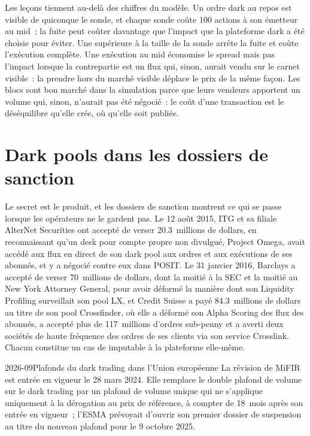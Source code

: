 Les leçons tiennent au-delà des chiffres du modèle. Un ordre dark au repos est visible de quiconque le sonde, et chaque sonde coûte 100 actions à son émetteur au
mid~; la fuite peut coûter davantage que l'impact que la plateforme dark a été choisie pour éviter. Une  supérieure à la taille de la sonde arrête la fuite et coûte
l'exécution complète. Une exécution au mid économise le spread mais pas l'impact lorsque la contrepartie est un flux qui, sinon, aurait vendu sur le carnet visible~: la prendre
hors du marché visible déplace le prix de la même façon. Les blocs sont bon marché dans la simulation parce que leurs vendeurs apportent un volume qui, sinon, n'aurait pas
été négocié~: le coût d'une transaction est le déséquilibre qu'elle crée, où qu'elle soit publiée.

\section{Dark pools dans les dossiers de sanction}

Le secret est le produit, et les dossiers de sanction montrent ce qui se passe lorsque les opérateurs ne le gardent pas. Le 12 août 2015, ITG et sa filiale AlterNet
Securities ont accepté de verser 20.3~millions de dollars, en reconnaissant qu'un desk pour compte propre non divulgué, Project Omega, avait accédé aux flux en direct de son dark pool
aux ordres et aux exécutions de ses abonnés, et y a négocié contre eux dans POSIT. Le 31 janvier 2016, Barclays a accepté de verser 70~millions de dollars, dont la moitié à la SEC et
la moitié au New York Attorney General, pour avoir déformé la manière dont son Liquidity Profiling surveillait son pool LX, et Credit Suisse a payé 84.3~millions de dollars au titre de son
pool Crossfinder, où elle a déformé son Alpha Scoring des flux des abonnés, a accepté plus de 117~millions d'ordres sub-penny et a averti deux
sociétés de haute fréquence des ordres de ses clients via son service Crosslink. Chacun constitue un cas de  imputable à la plateforme elle-même.

\begin{dated}{2026-09}{Plafonds du dark trading dans l'Union européenne}\label{dat:mx:dark-pools-and-blocks:svc}
La révision de MiFIR est entrée en vigueur le 28 mars 2024. Elle remplace le double plafond de volume sur le dark trading par un plafond de volume unique qui ne s'applique
uniquement à la dérogation au prix de référence, à compter de 18~mois après son entrée en vigueur~; l'ESMA prévoyait d'ouvrir son premier dossier de suspension au titre du nouveau plafond pour le 9 octobre 2025.
\end{dated}

